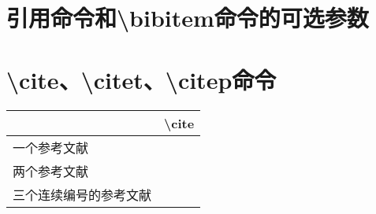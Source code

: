 ﻿\documentclass{article}
\begin{document}
\section{引用命令和\textbackslash{bibitem}命令的可选参数}
    \citet[见][这是说明文字]{author1.2001,author1.2002}

    \citet[见][这是说明文字]{author1.2001,author1.2002}

    \citet[见][]{author1.2001,author1.2002}


    \citet{author123.2005}

    \citet{author123.2005}

    \citet{author2134.2006}

\section{\textbackslash{cite}、\textbackslash{citet}、\textbackslash{citep}命令}

    \begin{tabular}{ll}
        \toprule
        &\textbackslash{}cite\\
        \midrule
        一个参考文献&\cite{author1.2001}\\
        \midrule
        两个参考文献&\cite{author1.2001,author2.2002}\\
        \midrule
        三个连续编号的参考文献&\cite{author2.2002,author3.2003,author4.2004}\\   
        \bottomrule
    \end{tabular}
        
\end{document}
